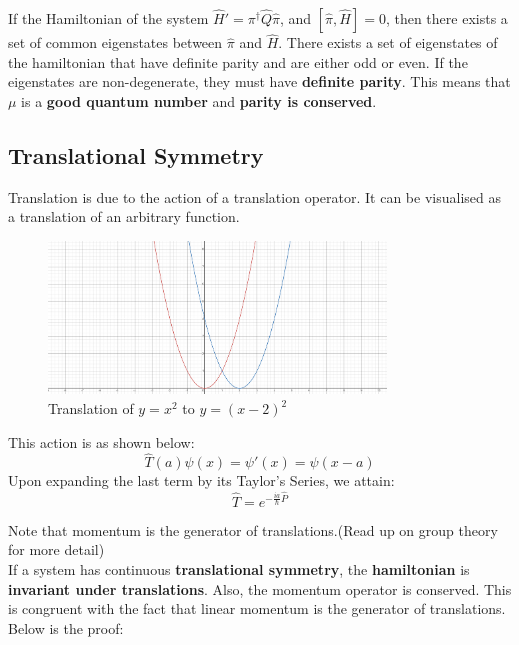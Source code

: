 \documentclass{article}
\begin{document}
\begin{flushleft}
If the Hamiltonian of the system $\hat{H}'=\pi^\dagger\hat{Q}\hat{\pi}$, and $[\hat{\pi},\hat{H}]=0$, then there exists a set of common eigenstates between $\hat{\pi}$ and $\hat{H}$. There exists a set of eigenstates of the hamiltonian that have definite parity and are either odd or even. If the eigenstates are non-degenerate, they must have \textbf{definite parity}. This means that $\mu$ is a\textbf{ good quantum number} and \textbf{parity is conserved}.
\pagebreak
\subsection{Translational Symmetry}

Translation is due to the action of a translation operator. It can be visualised as a translation of an arbitrary function.

\begin{figure}[h]
    \centering
    \includegraphics[width=0.8\textwidth]{Translation.PNG}
    \caption{Translation of $y=x^2$ to $y=(x-2)^2$}
    \label{fig:my_label}
    \end{figure}

This action is as shown below:
$$\hat{T}(a)\psi(x)=\psi'(x)=\psi(x-a)$$
Upon expanding the last term by its Taylor's Series, we attain:
$$\hat{T}=e^{-\frac{ia}{\hbar}{\hat{P}}}$$

Note that momentum is the generator of translations.(Read up on group theory for more detail)\\[0.5cm]

If a system has continuous \textbf{translational symmetry}, the \textbf{hamiltonian} is \textbf{invariant under translations}. Also, the momentum operator is conserved. This is congruent with the fact that linear momentum is the generator of translations. Below is the proof:


\end{flushleft}
\end{document}
